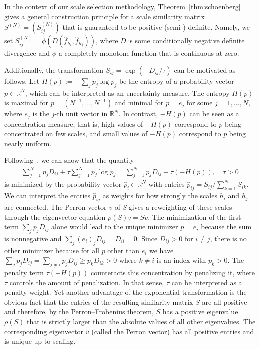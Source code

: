 In the context of our scale selection methodology, Theorem~\ref{thm:schoenberg} gives a general construction principle for a scale similarity matrix $S^{(N)}=(S^{(N)}_{ij})$ that is guaranteed to be positive (semi-) definite. Namely, we set $S^{(N)}_{ij}=\phi(D(\hat{f}_{h_i},\hat{f}_{h_j}))$, where $D$ is some conditionally negative definite divergence and $\phi$ a completely monotone function that is continuous at zero.

Additionally, the transformation $S_{ij}=\exp{(-D_{ij}/\tau)}$ can be motivated as follows. Let $H(p):=-\sum_jp_j\log{p_j}$ be the entropy of a probability vector $p\in\mathbb{R}^{N}$, which can be interpreted as an uncertainty measure. The entropy $H(p)$ is maximal for $p=(N^{-1},\dots,N^{-1})$ and minimal for $p=e_j$ for some $j=1,\dots,N$, where $e_j$ is the $j$-th unit vector in $\mathbb{R}^N$. In contrast, $-H(p)$ can be seen as a concentration measure, that is, high values of $-H(p)$ correspond to $p$ being concentrated on few scales, and small values of $-H(p)$ correspond to $p$ being nearly uniform.


Following~\cite[Equation~(2), Appendix Section~{A}]{anantharam_variational_2017}, we can show that the quantity
\begin{align*}
    \sum_{j=1}^{N}p_jD_{ij}+\tau\sum_{j=1}^{N}p_j\log{p_j}=\sum_{j=1}^{N}p_jD_{ij}+\tau(-H(p)),\quad\tau>0
\end{align*}
is minimized by the probability vector $\hat{p}_i\in\mathbb{R}^{N}$ with entries $\hat{p}_{ij}=S_{ij}/\sum_{k=1}^{N}S_{ik}$. We can interpret the entries $\hat{p}_{ij}$ as weights for how strongly the scales $h_i$ and $h_j$ are connected. The Perron vector $v$ of $S$ gives a reweighting of these scales through the eigenvector equation $\rho(S)v=Sv$. The minimization of the first term $\sum_jp_jD_{ij}$ alone would lead to the unique minimizer $p=e_i$ because the sum is nonnegative and $\sum_j(e_i)_jD_{ij}=D_{ii}=0$. Since $D_{ij}>0$ for $i\ne j$, there is no other minimizer because for all $p$ other than $e_i$ we have $\sum_jp_jD_{ij}=\sum_{j\ne i}p_jD_{ij}\ge p_kD_{ik}>0$ where $k\ne i$ is an index with $p_k>0$. The penalty term $\tau(-H(p))$ counteracts this concentration by penalizing it, where $\tau$ controls the amount of penalization. In that sense, $\tau$ can be interpreted as a penalty weight. Yet another advantage of the exponential transformation is the obvious fact that the entries of the resulting similarity matrix $S$ are all positive and therefore, by the Perron--Frobenius theorem, $S$ has a positive eigenvalue $\rho(S)$ that is strictly larger than the absolute values of all other eigenvalues. The corresponding eigenvector $v$ (called the Perron vector) has all positive entries and is unique up to scaling.

